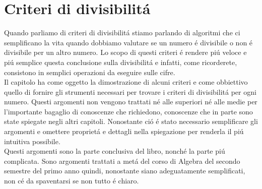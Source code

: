\documentclass[twoside]{article} %
\begin{document}
	 \section{Criteri di divisibilit\'a}
	Quando parliamo di criteri di divisibilit\'a stiamo parlando di algoritmi che ci semplificano la vita quando dobbiamo valutare se un numero \'e divisibile o non \'e divisibile per un altro numero. Lo scopo di questi criteri \'e rendere pi\'u veloce e pi\'u semplice questa conclusione sulla divisibilit\'a e infatti, come ricorderete, consistono in semplici operazioni da eseguire sulle cifre.\\
	Il capitolo ha come oggetto la dimostrazione di alcuni criteri e come obbiettivo quello di fornire gli strumenti necessari per trovare i criteri di divisibilit\'a per ogni numero. Questi argomenti non vengono trattati n\'e alle superiori n\'e alle medie per l'importante bagaglio di conoscenze che richiedono, conoscenze che in parte sono state spiegate negli altri capitoli. Nonostante ci\'o \'e stato necessario semplificare gli argomenti e omettere propriet\'a e dettagli nella spiegazione per renderla il pi\'u intuitiva possibile.\\
	 Questi argomenti sono la parte conclusiva del libro, nonch\'e la parte pi\'u complicata. Sono argomenti trattati a met\'a del corso di Algebra del secondo semestre del primo anno quindi, nonostante siano adeguatamente semplificati, non c\'e da spaventarsi se non tutto \'e chiaro.
	 \newpage 
\end{document}
